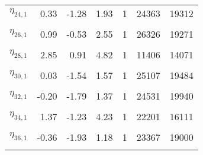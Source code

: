 \begin{longtable}[t]{lrrrrrr}
$\eta_{24,  1}$ & 0.33 & -1.28 & 1.93 & 1 & 24363 & 19312\\
\cellcolor{gray!6}{$\eta_{25,  1}$} & \cellcolor{gray!6}{1.74} & \cellcolor{gray!6}{-0.22} & \cellcolor{gray!6}{3.80} & \cellcolor{gray!6}{1} & \cellcolor{gray!6}{15355} & \cellcolor{gray!6}{19096}\\
$\eta_{26,  1}$ & 0.99 & -0.53 & 2.55 & 1 & 26326 & 19271\\
\cellcolor{gray!6}{$\eta_{27,  1}$} & \cellcolor{gray!6}{0.94} & \cellcolor{gray!6}{-0.47} & \cellcolor{gray!6}{2.36} & \cellcolor{gray!6}{1} & \cellcolor{gray!6}{29327} & \cellcolor{gray!6}{19600}\\
$\eta_{28,  1}$ & 2.85 & 0.91 & 4.82 & 1 & 11406 & 14071\\
\cellcolor{gray!6}{$\eta_{29,  1}$} & \cellcolor{gray!6}{-0.49} & \cellcolor{gray!6}{-1.76} & \cellcolor{gray!6}{0.78} & \cellcolor{gray!6}{1} & \cellcolor{gray!6}{25509} & \cellcolor{gray!6}{18934}\\
$\eta_{30,  1}$ & 0.03 & -1.54 & 1.57 & 1 & 25107 & 19484\\
\cellcolor{gray!6}{$\eta_{31,  1}$} & \cellcolor{gray!6}{1.33} & \cellcolor{gray!6}{-0.88} & \cellcolor{gray!6}{3.67} & \cellcolor{gray!6}{1} & \cellcolor{gray!6}{23575} & \cellcolor{gray!6}{19151}\\
$\eta_{32,  1}$ & -0.20 & -1.79 & 1.37 & 1 & 24531 & 19940\\
\cellcolor{gray!6}{$\eta_{33,  1}$} & \cellcolor{gray!6}{2.74} & \cellcolor{gray!6}{0.07} & \cellcolor{gray!6}{5.98} & \cellcolor{gray!6}{1} & \cellcolor{gray!6}{10830} & \cellcolor{gray!6}{14500}\\
$\eta_{34,  1}$ & 1.37 & -1.23 & 4.23 & 1 & 22201 & 16111\\
\cellcolor{gray!6}{$\eta_{35,  1}$} & \cellcolor{gray!6}{0.75} & \cellcolor{gray!6}{-0.88} & \cellcolor{gray!6}{2.44} & \cellcolor{gray!6}{1} & \cellcolor{gray!6}{25014} & \cellcolor{gray!6}{18186}\\
$\eta_{36,  1}$ & -0.36 & -1.93 & 1.18 & 1 & 23367 & 19000\\
\cellcolor{gray!6}{$\sigma_{y}$} & \cellcolor{gray!6}{0.90} & \cellcolor{gray!6}{0.80} & \cellcolor{gray!6}{1.01} & \cellcolor{gray!6}{1} & \cellcolor{gray!6}{18498} & \cellcolor{gray!6}{17938}\\*
\end{longtable}